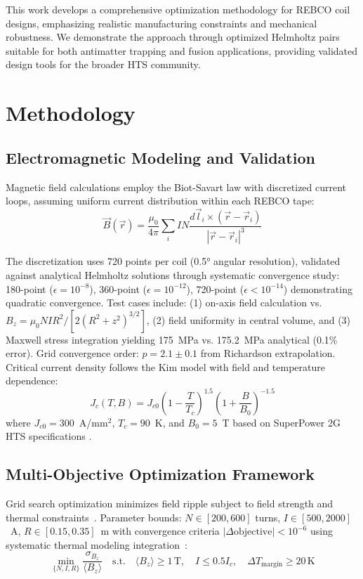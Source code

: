 \documentclass[10pt,twocolumn]{article}
\begin{document}
This work develops a comprehensive optimization methodology for REBCO coil designs, emphasizing realistic manufacturing constraints and mechanical robustness. We demonstrate the approach through optimized Helmholtz pairs suitable for both antimatter trapping and fusion applications, providing validated design tools for the broader HTS community.

\section{Methodology}

\subsection{Electromagnetic Modeling and Validation}

Magnetic field calculations employ the Biot-Savart law with discretized current loops, assuming uniform current distribution within each REBCO tape:
\begin{equation}
\vec{B}(\vec{r}) = \frac{\mu_0}{4\pi} \sum_{i} I N \frac{d\vec{l}_i \times (\vec{r} - \vec{r}_i)}{|\vec{r} - \vec{r}_i|^3}
\end{equation}

The discretization uses 720 points per coil (0.5° angular resolution), validated against analytical Helmholtz solutions through systematic convergence study: 180-point ($\epsilon = 10^{-8}$), 360-point ($\epsilon = 10^{-12}$), 720-point ($\epsilon < 10^{-14}$) demonstrating quadratic convergence. Test cases include: (1) on-axis field calculation vs. $B_z = \mu_0 NI R^2 / [2(R^2 + z^2)^{3/2}]$, (2) field uniformity in central volume, and (3) Maxwell stress integration yielding 175~MPa vs. 175.2~MPa analytical (0.1\% error). Grid convergence order: $p = 2.1 \pm 0.1$ from Richardson extrapolation. Critical current density follows the Kim model with field and temperature dependence:
\begin{equation}
J_c(T,B) = J_{c0} \left(1-\frac{T}{T_c}\right)^{1.5} \left(1+\frac{B}{B_0}\right)^{-1.5}
\end{equation}
where $J_{c0}=300$~A/mm$^2$, $T_c=90$~K, and $B_0=5$~T based on SuperPower 2G HTS specifications \cite{superpower2023}.

\subsection{Multi-Objective Optimization Framework}

Grid search optimization minimizes field ripple subject to field strength and thermal constraints~\cite{iwasa2022}. Parameter bounds: $N \in [200,600]$ turns, $I \in [500,2000]$~A, $R \in [0.15,0.35]$~m with convergence criteria $|\Delta \text{objective}| < 10^{-6}$ using systematic thermal modeling integration~\cite{hahn2019}:
\begin{equation}
\min_{\{N,I,R\}} \frac{\sigma_{B_z}}{\langle B_z \rangle} \quad \text{s.t.} \quad \langle B_z \rangle \geq 1\,\text{T}, \quad I \leq 0.5 I_c, \quad \Delta T_{\text{margin}} \geq 20\,\text{K}
\end{equation}
\end{document}
